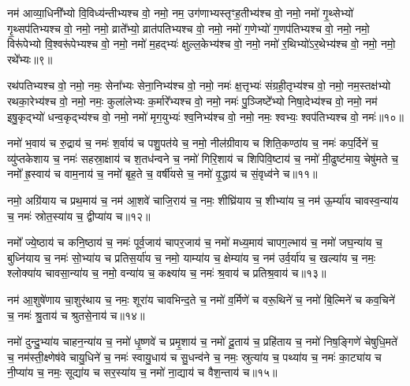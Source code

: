 {\anuvakamend[{कु॒लु॒ञ्चाना॒म्पत॑ये॒ नमो॒ नमो\-ऽश्व॑पतिभ्य॒स्त्रीणि॑ च॥३॥}]}

नम॑ आव्या॒धिनी᳚भ्यो वि॒विध्य॑न्तीभ्यश्च वो॒ नमो॒ नम॒ उग॑णाभ्यस्तृꣳह॒तीभ्य॑श्च वो॒ नमो॒ नमो॑ गृ॒थ्सेभ्यो॑ गृ॒थ्सप॑तिभ्यश्च वो॒ नमो॒ नमो॒ व्राते᳚भ्यो॒ व्रात॑पतिभ्यश्च वो॒ नमो॒ नमो॑ ग॒णेभ्यो॑ ग॒णप॑तिभ्यश्च वो॒ नमो॒ नमो॒ विरू॑पेभ्यो वि॒श्वरू॑पेभ्यश्च वो॒ नमो॒ नमो॑ म॒हद्भ्यः॑ क्षुल्ल॒केभ्य॑श्च वो॒ नमो॒ नमो॑ र॒थिभ्यो॑\-ऽर॒थेभ्य॑श्च वो॒ नमो॒ नमो॒ रथे᳚भ्यः॥९॥

रथ॑पतिभ्यश्च वो॒ नमो॒ नमः॒ सेना᳚भ्यः सेना॒निभ्य॑श्च वो॒ नमो॒ नमः॑ क्ष॒त्तृभ्यः॑ संग्रही॒तृभ्य॑श्च वो॒ नमो॒ नम॒स्तक्ष॑भ्यो रथका॒रेभ्य॑श्च वो॒ नमो॒ नमः॒ कुला॑लेभ्यः क॒र्मारे᳚भ्यश्च वो॒ नमो॒ नमः॑ पु॒ञ्जिष्टे᳚भ्यो निषा॒देभ्य॑श्च वो॒ नमो॒ नम॑ इषु॒कृद्भ्यो॑ धन्व॒कृद्भ्य॑श्च वो॒ नमो॒ नमो॑ मृग॒युभ्यः॑ श्व॒निभ्य॑श्च वो॒ नमो॒ नमः॒ श्वभ्यः॒ श्वप॑तिभ्यश्च वो॒ नमः॑॥१०॥

{\anuvakamend[{रथे᳚भ्यः॒ श्वप॑तिभ्यश्च॒ द्वे च॑॥४॥}]}

नमो॑ भ॒वाय॑ च रु॒द्राय॑ च॒ नमः॑ श॒र्वाय॑ च पशु॒पत॑ये च॒ नमो॒ नील॑ग्रीवाय च शिति॒कण्ठा॑य च॒ नमः॑ कप॒र्दिने॑ च॒ व्यु॑प्तकेशाय च॒ नमः॑ सहस्रा॒क्षाय॑ च श॒तध॑न्वने च॒ नमो॑ गिरि॒शाय॑ च शिपिवि॒ष्टाय॑ च॒ नमो॑ मी॒ढुष्ट॑माय॒ चेषु॑मते च॒ नमो᳚ ह्र॒स्वाय॑ च वाम॒नाय॑ च॒ नमो॑ बृह॒ते च॒ वर्\mbox{}षी॑यसे च॒ नमो॑ वृ॒द्धाय॑ च सं॒वृध्व॑ने च॥११॥

नमो॒ अग्रि॑याय च प्रथ॒माय॑ च॒ नम॑ आ॒शवे॑ चाजि॒राय॑ च॒ नमः॒ शीघ्रि॑याय च॒ शीभ्या॑य च॒ नम॑ ऊ॒र्म्या॑य चावस्व॒न्या॑य च॒ नमः॑ स्रोत॒स्या॑य च॒ द्वीप्या॑य च॥१२॥

{\anuvakamend[{सं॒ वृध्व॑ने च॒ पञ्च॑विꣳशतिश्च॥५॥}]}

नमो᳚ ज्ये॒ष्ठाय॑ च कनि॒ष्ठाय॑ च॒ नमः॑ पूर्व॒जाय॑ चापर॒जाय॑ च॒ नमो॑ मध्य॒माय॑ चापग॒ल्भाय॑ च॒ नमो॑ जघ॒न्या॑य च॒ बुध्नि॑याय च॒ नमः॑ सो॒भ्या॑य च प्रतिस॒र्या॑य च॒ नमो॒ याम्या॑य च॒ क्षेम्या॑य च॒ नम॑ उर्व॒र्या॑य च॒ खल्या॑य च॒ नमः॒ श्लोक्या॑य चावसा॒न्या॑य च॒ नमो॒ वन्या॑य च॒ कक्ष्या॑य च॒ नमः॑ श्र॒वाय॑ च प्रतिश्र॒वाय॑ च॥१३॥

नम॑ आ॒शुषे॑णाय चा॒शुर॑थाय च॒ नमः॒ शूरा॑य चावभिन्द॒ते च॒ नमो॑ व॒र्मिणे॑ च वरू॒थिने॑ च॒ नमो॑ बि॒ल्मिने॑ च कव॒चिने॑ च॒ नमः॑ श्रु॒ताय॑ च श्रुतसे॒नाय॑ च॥१४॥

{\anuvakamend[{प्र॒ति॒श्र॒वाय॑ च॒ पञ्च॑विꣳशतिश्च॥६॥}]}

नमो॑ दुन्दु॒भ्या॑य चाहन॒न्या॑य च॒ नमो॑ धृ॒ष्णवे॑ च प्रमृ॒शाय॑ च॒ नमो॑ दू॒ताय॑ च॒ प्रहि॑ताय च॒ नमो॑ निष॒ङ्गिणे॑ चेषुधि॒मते॑ च॒ नम॑स्ती॒क्ष्णेष॑वे चायु॒धिने॑ च॒ नमः॑ स्वायु॒धाय॑ च सु॒धन्व॑ने च॒ नमः॒ स्रुत्या॑य च॒ पथ्या॑य च॒ नमः॑ का॒ट्या॑य च नी॒प्या॑य च॒ नमः॒ सूद्या॑य च सर॒स्या॑य च॒ नमो॑ ना॒द्याय॑ च वैश॒न्ताय॑ च॥१५॥

